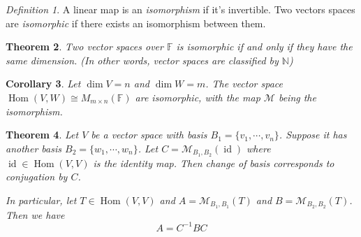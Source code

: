 \documentclass[12pt]{amsart}
\newcommand{\fff}[0]{\mathbb{F}}
\DeclareMathOperator{\Hom}{Hom}
\newcommand{\calM}[0]{\mathcal{M}}
\DeclareMathOperator{\id}{id}
\newtheorem{theorem}{Theorem}[section]
\newtheorem{corollary}[theorem]{Corollary}
\theoremstyle{remark}
\newtheorem{definition}[theorem]{Definition}
\numberwithin{equation}{section}
\begin{document}
	
	
	\begin{definition}
		A linear map is an \emph{isomorphism} if it's invertible. Two vectors spaces are \emph{isomorphic} if there exists an isomorphism between them.
	\end{definition}
	\begin{theorem}
		Two vector spaces over $\fff$ is isomorphic if and only if they have the same dimension. (In other words, vector spaces are classified by $\mathbb{N}$)
	\end{theorem}
	\begin{corollary}Let $\dim V=n$ and $\dim W=m$.
		The vector space $\Hom(V,W)\cong M_{m\times n}(\fff)$ are isomorphic, with the map $\calM$  being the isomorphism.
	\end{corollary}
	\begin{theorem} Let $V$ be a vector space with basis $B_1=\{v_1,\cdots,v_n\}$. Suppose it has another basis $B_2=\{w_1,\cdots,w_n\}$. Let $C=\calM_{B_1,B_2}(\id)$ where $\id\in\Hom(V,V)$ is the identity map. Then change of basis corresponds to conjugation by $C$.
	
	In particular, let $T\in\Hom(V,V)$ and $A=\calM_{B_1,B_1}(T)$ and $B=\calM_{B_2,B_2}(T)$. Then we have
	\[A=C^{-1}BC\]
	\end{theorem}
\end{document}

